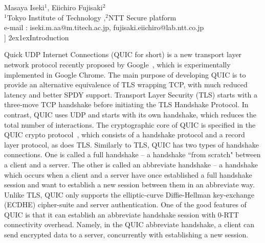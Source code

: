 \documentclass[11pt,a4j]{jarticle}
\makeatletter
\renewcommand{\baselinestretch}{1.3}\selectfont
\def\Title#1{{\Large\bf#1}\\[6pt]}
\def\Author#1{{\normalsize\hspace*{2zw}#1}\\[-4pt]}
\def\Affiliation#1{{\normalsize\hspace*{2zw}#1}\\[-5pt]}
\def\Email#1{\hspace*{2zw}e-mail : #1\\[0pt]}
\renewcommand{\section}{\@startsection{section}{1}{\z@}%
{2ex}{1ex}{\reset@font\large\bfseries}}%
\makeatother
\begin{document}
\twocolumn[
%
\Title{On the security of QUIC}
\Author{Masaya Iseki$^{1}$, Eiichiro Fujisaki$^{2}$}
\Affiliation{$^{1}$Tokyo Institute of Technology ,$^{2}$NTT Secure platform}
\Email{iseki.m.aa@m.titech.ac.jp, fujisaki.eiichiro@lab.ntt.co.jp}
%
]
\renewcommand{\baselinestretch}{0.95}\selectfont
%
%
\section{Introduction}

Quick UDP Internet Connections (QUIC for short)
is a new transport layer network protocol recently proposed by Google~\cite{QUIC},
which is experimentally implemented in Google Chrome.
The main purpose of developing QUIC is to provide an alternative equivalence of TLS wrapping TCP,
with much reduced latency and better SPDY support.
Transport Layer Security (TLS) starts with a three-move TCP handshake
before initiating the TLS Handshake Protocol.
In contrast, QUIC uses UDP and starts with its own handshake,
which reduces the total number of interactions.
The cryptographic core of QUIC is specified in the QUIC crypto protocol~\cite{QUIC:Crypto},
which consists of a handshake protocol and a record layer protocol,
as does TLS.
Similarly to TLS, QUIC has two types of handshake connections.
One is called a full handshake --
a handshake ``from scratch" between a client and a server.
The other is called an abbreviate handshake -- a handshake which occurs when a client and a server have once established a full handshake session
and want to establish a new session between them in an abbreviate way.
Unlike TLS,
QUIC only supports the elliptic-curve Diffie-Hellman key-exchange (ECDHE) cipher-suite and server authentication.
%
One of the good features of QUIC is that it can establish an abbreviate handshake session
with $0$-RTT connectivity overhead.
Namely, in the QUIC abbreviate handshake, a client can
send encrypted data to a server, concurrently with establishing a new session.
\end{document}
